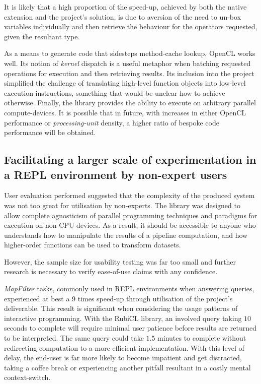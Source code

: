 It is likely that a high proportion of the speed-up, achieved by both the native extension and the project's solution, is due to aversion of the need to un-box variables individually and then retrieve the behaviour for the operators requested, given the resultant type.

As a means to generate code that sidesteps method-cache lookup, \ac{OpenCL} works well. Its notion of \emph{kernel} dispatch is a useful metaphor when batching requested operations for execution and then retrieving results. Its inclusion into the project simplified the challenge of translating high-level function objects into low-level execution instructions, something that would be unclear how to achieve otherwise. Finally, the library provides the ability to execute on arbitrary parallel compute-devices. It is possible that in future, with increases in either \ac{OpenCL} performance or \emph{processing-unit} density, a higher ratio of bespoke code performance will be obtained.
\subsection{Facilitating a larger scale of experimentation in a REPL environment by non-expert users}
User evaluation performed suggested that the complexity of the produced system was not too great for utilisation by non-experts. The library was designed to allow complete agnosticism of parallel programming techniques and paradigms for execution on non-\ac{CPU} devices. As a result, it should be accessible to anyone who understands how to manipulate the results of a pipeline computation, and how higher-order functions can be used to transform datasets.

However, the sample size for usability testing was far too small and further research is necessary to verify ease-of-use claims with any confidence.

\emph{MapFilter} tasks, commonly used in \ac{REPL} environments when answering queries, experienced at best a $9$ times speed-up through utilisation of the project's deliverable. This result is significant when considering the usage patterns of interactive programming. With the RubiCL library, an involved query taking $10$ seconds to complete will require minimal user patience before results are returned to be interpreted. The same query could take $1.5$ minutes to complete without redirecting computation to a more efficient implementation. With this level of delay, the end-user is far more likely to become impatient and get distracted, taking a coffee break or experiencing another pitfall resultant in a costly mental context-switch.

